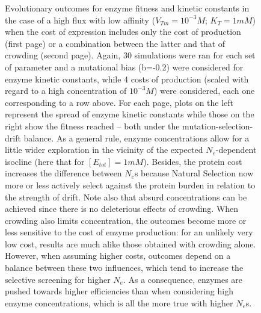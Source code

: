 \begin{figure} [h!]
\begin{center}
\caption{Evolutionary outcomes for enzyme fitness and kinetic constants in the case of a high flux with low affinity ($V_{Tm}=10^{-3}M$; $K_T=1 mM$) when the cost of expression includes only the cost of production (first page) or a combination between the latter and that of crowding (second page). Again, 30 simulations were ran for each set of parameter and a mutational bias (b=-0.2) were considered for enzyme kinetic constants, while 4 costs of production (scaled with regard to a high concentration of $10^{-3}M$) were considered, each one corresponding to a row above. For each page, plots on the left represent the spread of enzyme kinetic constants while those on the right show the fitness reached -- both under the mutation-selection-drift balance. As a general rule, enzyme concentrations allow for a little wider exploration in the vicinity of the expected $N_e$-dependent isocline (here that for $[E_{tot}]=1mM$). Besides, the protein cost increases the difference between $N_e$s because Natural Selection now more or less actively select against the protein burden in relation to the strength of drift. Note also that absurd concentrations can be achieved since there is no deleterious effects of crowding. When crowding also limits concentration, the outcomes become more or less sensitive to the cost of enzyme production: for an unlikely very low cost, results are much alike those obtained with crowding alone. However, when assuming higher costs, outcomes depend on a balance between these two influences, which tend to increase the selective screening for higher $N_e$. As a consequence, enzymes are pushed towards higher efficiencies than when considering high enzyme concentrations, which is all the more true with higher $N_e$s.}
\label{fig8a2-ann}
\end{center}
\end{figure}


